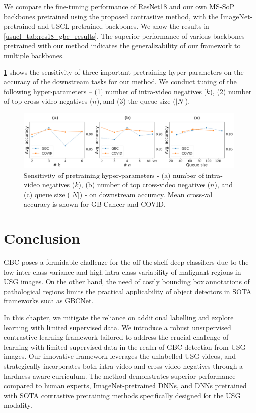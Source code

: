 %
We compare the fine-tuning performance of ResNet18 and our own MS-SoP \cite{basu2022surpassing} backbones pretrained using the proposed contrastive method, with the ImageNet-pretrained and USCL-pretrained backbones. We show the results in \cref{usucl_tab:res18_gbc_results}. The superior performance of various backbones pretrained with our method indicates the generalizability of our framework to multiple backbones.

%
\cref{usucl_fig:sens-hyper} shows the sensitivity of three important pretraining hyper-parameters on the accuracy of the downstream tasks for our method. We conduct tuning of the following hyper-parameters -- (1) number of intra-video negatives ($k$), (2) number of top cross-video negatives ($n$), and (3) the queue size ($|N|$).
%
\begin{figure}[t]
    \centering
    \includegraphics[width=\linewidth]{figs/usucl/sensitivity.png}
    \caption[Sensitivity of pretraining hyper-parameters]{Sensitivity of pretraining hyper-parameters - (a) number of intra-video negatives ($k$), (b) number of top cross-video negatives ($n$), and (c) queue size ($|N|$) - on downstream accuracy. Mean cross-val accuracy is shown for GB Cancer and COVID.}
    \label{usucl_fig:sens-hyper}
\end{figure}

\section{Conclusion}
%
GBC poses a formidable challenge for the off-the-shelf deep classifiers due to the low inter-class variance and high intra-class variability of malignant regions in USG images. On the other hand, the need of costly bounding box annotations of pathological regions limits the practical applicability of object detectors in SOTA frameworks such as GBCNet. 

In this chapter, we mitigate the reliance on additional labelling and explore learning with limited supervised data. We introduce a robust unsupervised contrastive learning framework tailored to address the crucial challenge of learning with limited supervised data in the realm of GBC detection from USG images. Our innovative framework leverages the unlabelled USG videos, and strategically incorporates both intra-video and cross-video negatives through a hardness-aware curriculum. The method demonstrates superior performance compared to human experts, ImageNet-pretrained DNNs, and DNNs pretrained with SOTA contrastive pretraining methods specifically designed for the USG modality.

